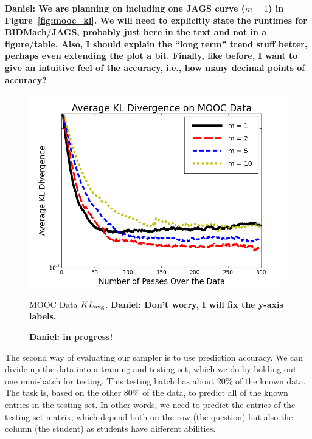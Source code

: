 \documentclass{article} %
\begin{document}
\textbf{Daniel: We are planning on including one JAGS curve ($m=1$) in Figure~\ref{fig:mooc_kl}. We
will need to explicitly state the runtimes for BIDMach/JAGS, probably just here in the text and not
in a figure/table. Also, I should explain the ``long term'' trend stuff better, perhaps even
extending the plot a bit. Finally, like before, I want to give an intuitive feel of the accuracy,
i.e., how many decimal points of accuracy?}

\begin{figure}[t]
  \centering
  \begin{minipage}{.5\textwidth}
    \centering
    \includegraphics[width=1\textwidth]{fig_mooc_kl_div.png}
    \caption{MOOC Data $KL_{\rm avg}$. \textbf{Daniel: Don't worry, I will fix the y-axis labels.}}
    \label{fig:mooc_kl}
  \end{minipage}\hfill
    \begin{minipage}{.5\textwidth}
    \centering
    \fbox{\rule[-.5cm]{0cm}{4cm} \rule[-.5cm]{4cm}{0cm}}
    \caption{\textbf{Daniel: in progress!}}
    \label{fig:mooc_accuracy}
  \end{minipage}
\end{figure}

The second way of evaluating our sampler is to use prediction accuracy. We can divide up the data
into a training and testing set, which we do by holding out one mini-batch for testing. This testing
batch has about 20\% of the known data. The task is, based on the other 80\% of the data, to predict
all of the known entries in the testing set. In other words, we need to predict the entries of the
testing set matrix, which depend both on the row (the question) but also the column (the student) as
students have different abilities.
\end{document}
